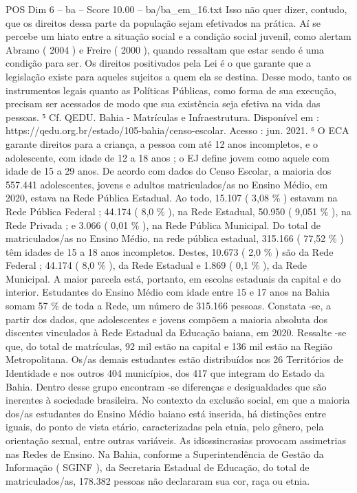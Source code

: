 \begin{textsample}{POS Dim 6 – ba – Score 10.00 – ba/ba\_em\_16.txt}
Isso não quer dizer, contudo, que os direitos dessa parte da população sejam efetivados na prática.
Aí se percebe um hiato entre a situação social e a condição social juvenil, como alertam Abramo ( 2004 ) e Freire ( 2000 ), quando ressaltam que estar sendo é uma condição para ser.
Os direitos positivados pela Lei é o que garante que a legislação existe para aqueles sujeitos a quem ela se destina.
Desse modo, tanto os instrumentos legais quanto as Políticas Públicas, como forma de sua execução, precisam ser acessados de modo que sua existência seja efetiva na vida das pessoas. ⁵ Cf.
QEDU.
Bahia - Matrículas e Infraestrutura.
Disponível em : https://qedu.org.br/estado/105-bahia/censo-escolar.
Acesso : jun. 2021. ⁶ O ECA garante direitos para a criança, a pessoa com até 12 anos incompletos, e o adolescente, com idade de 12 a 18 anos ; o EJ define jovem como aquele com idade de 15 a 29 anos.
De acordo com dados do Censo Escolar, a maioria dos 557.441 adolescentes, jovens e adultos matriculados/as no Ensino Médio, em 2020, estava na Rede Pública Estadual.
Ao todo, 15.107 ( 3,08 \% ) estavam na Rede Pública Federal ; 44.174 ( 8,0 \% ), na Rede Estadual, 50.950 ( 9,051 \% ), na Rede Privada ; e 3.066 ( 0,01 \% ), na Rede Pública Municipal.
Do total de matriculados/as no Ensino Médio, na rede pública estadual, 315.166 ( 77,52 \% ) têm idades de 15 a 18 anos incompletos.
Destes, 10.673 ( 2,0 \% ) são da Rede Federal ; 44.174 ( 8,0 \% ), da Rede Estadual e 1.869 ( 0,1 \% ), da Rede Municipal.
A maior parcela está, portanto, em escolas estaduais da capital e do interior.
Estudantes do Ensino Médio com idade entre 15 e 17 anos na Bahia somam 57 \% de toda a Rede, um número de 315.166 pessoas.
Constata -se, a partir dos dados, que adolescentes e jovens compõem a maioria absoluta dos discentes vinculados à Rede Estadual da Educação baiana, em 2020.
Ressalte -se que, do total de matrículas, 92 mil estão na capital e 136 mil estão na Região Metropolitana.
Os/as demais estudantes estão distribuídos nos 26 Territórios de Identidade e nos outros 404 municípios, dos 417 que integram do Estado da Bahia.
Dentro desse grupo encontram -se diferenças e desigualdades que são inerentes à sociedade brasileira.
No contexto da exclusão social, em que a maioria dos/as estudantes do Ensino Médio baiano está inserida, há distinções entre iguais, do ponto de vista etário, caracterizadas pela etnia, pelo gênero, pela orientação sexual, entre outras variáveis.
As idiossincrasias provocam assimetrias nas Redes de Ensino.
Na Bahia, conforme a Superintendência de Gestão da Informação ( SGINF ), da Secretaria Estadual de Educação, do total de matriculados/as, 178.382 pessoas não declararam sua cor, raça ou etnia.

\end{textsample}
